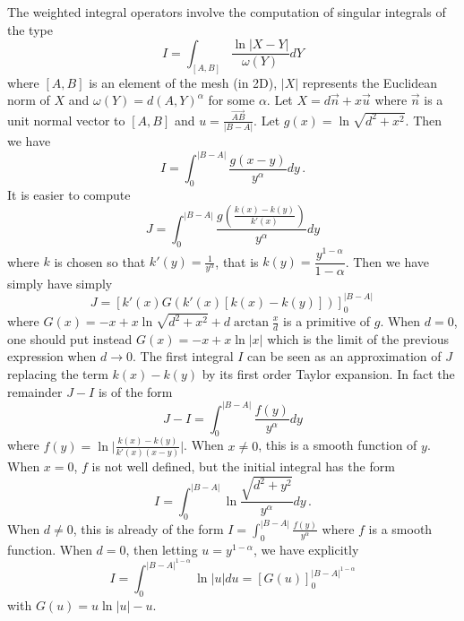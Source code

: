 \documentclass[french]{article}
\begin{document}
The weighted integral operators involve the computation of singular integrals of the type
\[I = \int_{[A,B]} \frac{\ln|X-Y|}{\omega(Y)}dY\]
where $[A,B]$ is an element of the mesh (in 2D), $|X|$ represents the Euclidean norm of $X$ and $\omega(Y) = d(A,Y)^\alpha$ for some $\alpha$. 
Let $X = d\vec{n} + x \vec u$ where $\vec n$ is a unit normal vector to $[A,B]$ and $u = \frac{\overrightarrow{AB}}{|B-A|}$. Let $g(x) = \ln\sqrt{d^2 + x^2}$. Then we have
\[I = \int_{0}^{|B - A|} \frac{g(x-y)}{y^\alpha}dy\,.\]
It is easier to compute 
\[J = \int_{0}^{|B - A|} \frac{g\left(\frac{k(x)-k(y)}{k'(x)}\right)}{y^\alpha}dy\]
where $k$ is chosen so that $k'(y) = \frac{1}{y^\alpha}$, that is $k(y) = \dfrac{y^{1 - \alpha}}{1-\alpha}$. Then we have simply have simply
\[J = \left[k'(x)G\left(k'(x)[k(x) - k(y)]\right)\right]_{0}^{|B-A|}\,\]
where $G(x) = - x + x\ln\sqrt{d^2 + x^2} + d \arctan\frac{x}{d}$ is a primitive of $g$. When $d = 0$, one should put instead $G(x) = -x + x\ln|x|$ which is the limit of the previous expression when $d \to 0$.   
The first integral $I$ can be seen as an approximation of $J$ replacing the term $k(x) - k(y)$ by its first order Taylor expansion.
In fact the remainder $J - I$ is of the form
\[J - I = \int_{0}^{|B - A|} \frac{f(y)}{y^\alpha}dy\]
where $f(y) = \ln  \lvert \frac{k(x) - k(y)}{k'(x)(x - y)}\rvert$. When $x \neq 0$, this is a smooth function of $y$. When $x= 0$, $f$ is not well defined, but the initial integral has the form
\[I = \int_0^{|B-A|} \ln \frac{\sqrt{d^2 + y^2}}{y^\alpha}dy\,.\]
When $d \neq 0$, this is already of the form $I = \int_{0}^{|B - A|}\frac{f(y)}{y^\alpha}$ where $f$ is a smooth function. When $d = 0$, then letting $u = y^{1 - \alpha}$, we have explicitly 
\[I = \int_{0}^{|B-A|^{1 - \alpha}} \ln |u| du = \left[G(u)\right]_{0}^{|B-A|^{1 - \alpha}}\]
with $G(u) = u\ln|u| - u$.  
\end{document}
